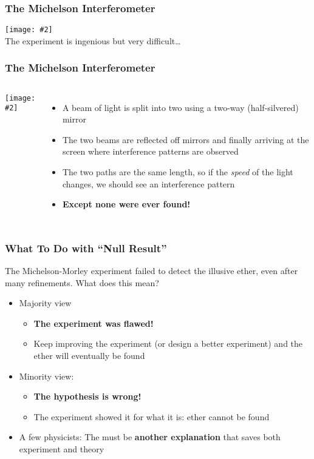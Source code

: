 \documentclass[12pt,compress,aspectratio=169]{beamer}
\newcommand{\pic}[2]{\texttt{[image: \#2]}}
\begin{document}
\begin{frame}
  \frametitle{The Michelson Interferometer}
  \pic{1}{graphics/michelsonmorley.jpg}\\
  The experiment is ingenious but very difficult\ldots
\end{frame}



\begin{frame}
  \frametitle{The Michelson Interferometer}
  \begin{columns}
    \begin{center}
      \pic{1.1}{graphics/313754.jpg}
    \end{center}

    \begin{itemize}
    \item A beam of light is split into two using a two-way (half-silvered)
      mirror
    \item The two beams are reflected off mirrors and finally arriving at the
      screen where interference patterns are observed
    \item The two paths are the same length, so if the \emph{speed} of the light
      changes, we should see an interference pattern
    \item\textbf{Except none were ever found!}
    \end{itemize}
  \end{columns}
\end{frame}



\begin{frame}
  \frametitle{What To Do with ``Null Result''}
  The Michelson-Morley experiment failed to detect the illusive ether, even
  after many refinements. What does this mean?
  \begin{itemize}
  \item Majority view
    \begin{itemize}
    \item\textbf{The experiment was flawed!}
    \item Keep improving the experiment (or design a better experiment) and the
      ether will eventually be found
    \end{itemize}
  \item Minority view:
    \begin{itemize}
    \item\textbf{The hypothesis is wrong!}
    \item The experiment showed it for what it is: ether cannot be found
    \end{itemize}
  \item A few physicists: The must be \textbf{another explanation} that saves
    both experiment and theory
  \end{itemize}
\end{frame}
\end{document}

